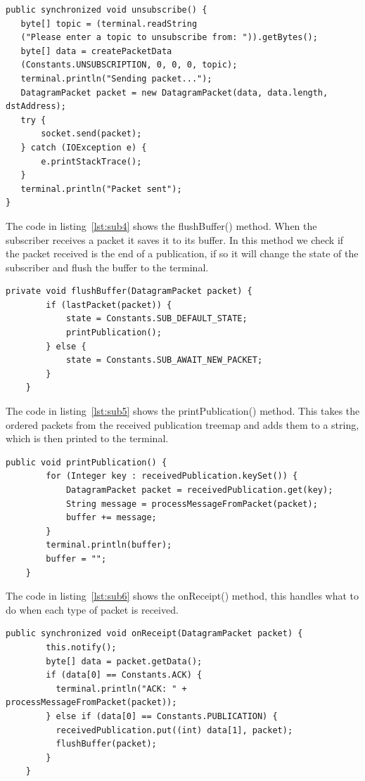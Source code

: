 \documentclass{article}
\begin{document}
\begin{lstlisting}[caption={[Sample Code 2]unsubscribe() method, takes input from the user and sends a unsubscribe packet to the broker}, label={lst:sub3}]
public synchronized void unsubscribe() {
   byte[] topic = (terminal.readString
   ("Please enter a topic to unsubscribe from: ")).getBytes();
   byte[] data = createPacketData
   (Constants.UNSUBSCRIPTION, 0, 0, 0, topic);
   terminal.println("Sending packet...");
   DatagramPacket packet = new DatagramPacket(data, data.length, dstAddress);
   try {
	   socket.send(packet);
   } catch (IOException e) {
	   e.printStackTrace();
   }
   terminal.println("Packet sent");
}
\end{lstlisting}

The code in listing~\ref{lst:sub4} shows the flushBuffer() method. When the subscriber receives a packet it saves it to its buffer. In this method we check if the packet received is the end of a publication, if so it will change the state of the subscriber and flush the buffer to the terminal.

\begin{lstlisting}[caption={[Sample Code 2]flushBuffer() method}, label={lst:sub4}]
private void flushBuffer(DatagramPacket packet) {
		if (lastPacket(packet)) {
			state = Constants.SUB_DEFAULT_STATE;
			printPublication();
		} else {
			state = Constants.SUB_AWAIT_NEW_PACKET;
		}
	}
\end{lstlisting}

The code in listing~\ref{lst:sub5} shows the printPublication() method. This takes the ordered packets from the received publication treemap and adds them to a string, which is then printed to the terminal.

\begin{lstlisting}[caption={[Sample Code 2]printPublication() method, prints out a publication to the terminal}, label={lst:sub5}]
public void printPublication() {
		for (Integer key : receivedPublication.keySet()) {
			DatagramPacket packet = receivedPublication.get(key);
			String message = processMessageFromPacket(packet);
			buffer += message;
		}
		terminal.println(buffer);
		buffer = "";
	}
\end{lstlisting}

The code in listing~\ref{lst:sub6} shows the onReceipt() method, this handles what to do when each type of packet is received.

\begin{lstlisting}[caption={[Sample Code 2]onReceipt() method, handles packets received on the subscribers port}, label={lst:sub6}]
public synchronized void onReceipt(DatagramPacket packet) {
		this.notify();
		byte[] data = packet.getData();
		if (data[0] == Constants.ACK) {
		  terminal.println("ACK: " + processMessageFromPacket(packet));
		} else if (data[0] == Constants.PUBLICATION) {
		  receivedPublication.put((int) data[1], packet);
		  flushBuffer(packet);
		}
	}
\end{lstlisting}
\end{document}
